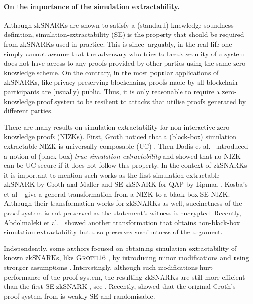 \let\accentvec\vec \documentclass[runningheads]{llncs}
\begin{document}
\paragraph{On the importance of the simulation extractability.}
Although zkSNARKs are shown to satisfy a (standard) knowledge soundness
definition, simulation-extractability (SE) is the property that should be
required from zkSNARKs used in practice. This is since, arguably, in the real
life one simply cannot assume that the adversary who tries to break security of
a system does not have access to any proofs provided by other parties using the
same zero-knowledge scheme. On the contrary, in the most popular applications of
zkSNARKs, like privacy-preserving blockchains, proofs made by all
blockchain-participants are (usually) public. Thus, it is only reasonable to
require a zero-knowledge proof system to be resilient to attacks that utilise
proofs generated by different parties.

There are many results on simulation extractability for non-interactive
zero-knowledge proofs (NIZKs). First, Groth \cite{AC:Groth07} noticed that a
(black-box) simulation extractable NIZK is universally-composable (UC)
\cite{EPRINT:Canetti00}. Then Dodis et al.~\cite{AC:DHLW10} introduced a notion
of (black-box) \emph{true simulation extractability} and showed that no NIZK can
be UC-secure if it does not follow this property. In the context of zkSNARKs it is
important to mention such works as the first simulation-extractable zkSNARK by
Groth and Maller \cite{C:GroMal17} and SE zkSNARK for QAP by Lipmaa
\cite{EPRINT:Lipmaa19a}. Kosba's et al.~\cite{EPRINT:KZMQCP15} give a general
transformation from a NIZK to a black-box SE NIZK. Although their transformation
works for zkSNARKs as well, succinctness of the proof system is not preserved as
the statement's witness is encrypted. Recently, Abdolmaleki et
al.~\cite{CCS:AbdRamSla20} showed another transformation that obtains
non-black-box simulation extractability but also preserves succinctness of the
argument.

Independently, some authors focused on obtaining simulation extractability of
known zkSNARKs, like $\textsc{Groth16}$ \cite{EC:Groth16}, by introducing minor
modifications and using stronger assumptions
\cite{EPRINT:BowGab18,EPRINT:AtaBag19}. Interestingly, although such
modifications hurt performance of the proof system, the resulting zkSNARKs are
still more efficient than the first SE zkSNARK \cite{C:GroMal17}, see
\cite{EPRINT:AtaBag19}. Recently, \cite{EPRINT:BKSV20} showed that the original
Groth's proof system from \cite{EC:Groth16} is weakly SE and randomisable.
\end{document}
